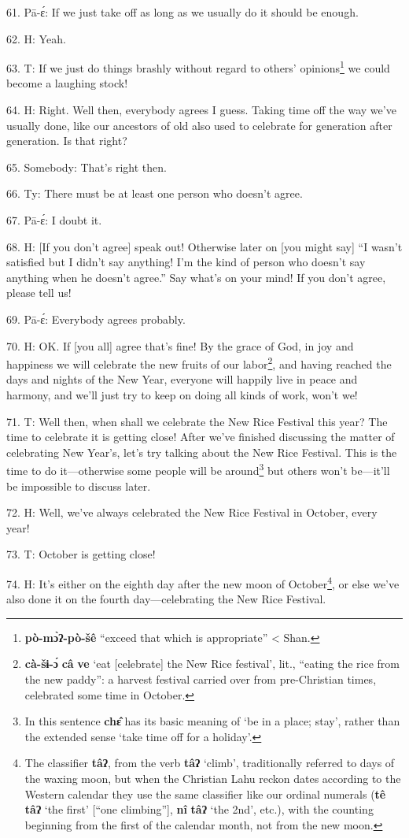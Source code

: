 61. Pā-ɛ́: If we just take off as long as we usually do it should be enough.

62. H: Yeah.

63. T: If we just do things brashly without regard to others' opinions\footnote{\textbf{pò-mɔ̀ʔ-pò-šê} ``exceed that which is appropriate'' < Shan.} we
could become a laughing stock!

64. H: Right. Well then, everybody agrees I guess. Taking time off the way we've
usually done, like our ancestors of old also used to celebrate for generation after
generation. Is that right?

65. Somebody: That's right then.

66. Ty: There must be at least one person who doesn't agree.

67. Pā-ɛ́: I doubt it.

68. H: [If you don't agree] speak out! Otherwise later on [you might say] ``I
wasn't satisfied but I didn't say anything! I'm the kind of person who doesn't
say anything when he doesn't agree.'' Say what's on your mind! If you don't agree,
please tell us!

69. Pā-ɛ́: Everybody agrees probably.

70. H: OK. If [you all] agree that's fine! By the grace of God, in joy and happiness
we will celebrate the new fruits of our labor\footnote{\textbf{cà-šɨ-ɔ́} \textbf{câ} \textbf{ve} `eat [celebrate] the New Rice festival', lit., ``eating the rice from the new paddy'': a harvest festival carried over from pre-Christian times, celebrated some time in October.}, and having reached the days
and nights of the New Year, everyone will happily live in peace and harmony, and
we'll just try to keep on doing all kinds of work, won't we!

71. T: Well then, when shall we celebrate the New Rice Festival this year? The
time to celebrate it is getting close! After we've finished discussing the matter
of celebrating New Year's, let's try talking about the New Rice Festival. This
is the time to do it---otherwise some people will be around\footnote{In this sentence \textbf{chɛ̂} has its basic meaning of `be in a place; stay', rather than the extended sense `take time off for a holiday'.} but others won't
be---it'll be impossible to discuss later.

72. H: Well, we've always celebrated the New Rice Festival in October, every year!

73. T: October is getting close!

74. H: It's either on the eighth day after the new moon of October\footnote{The classifier \textbf{tâʔ}, from the verb \textbf{tâʔ} `climb', traditionally referred to days of the waxing moon, but when the Christian Lahu reckon dates according to the Western calendar they use the same classifier like our ordinal numerals (\textbf{tê} \textbf{tâʔ} `the first' [``one climbing''], \textbf{nî} \textbf{tâʔ} `the 2nd', etc.), with the counting beginning from the first of the calendar month, not from the new moon.}, or else
we've also done it on the fourth day---celebrating the New Rice Festival.

